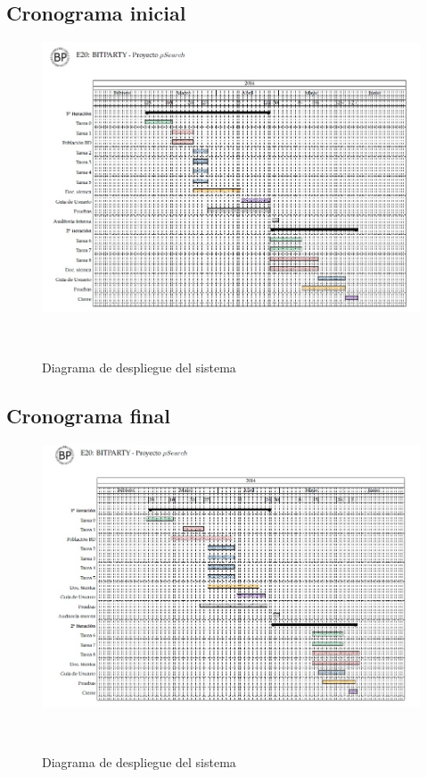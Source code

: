 \documentclass[10pt,spanish]{article}
\begin{document}
\subsection{Cronograma inicial}
%
\vspace{.2cm}
\begin{figure}[ht]
	\centerline{\includegraphics[scale=0.80]{img/cronograma_inicial}}\
	\caption{Diagrama de despliegue del sistema}
	\label{fig:cronogramaInicial}
\end{figure}
\newpage

\subsection{Cronograma final}
%
\vspace{.2cm}
\begin{figure}[ht]
	\centerline{\includegraphics[scale=0.75]{img/cronograma_final}}\
	\caption{Diagrama de despliegue del sistema}
	\label{fig:cronogramaFinal}
\end{figure}
\end{document}
